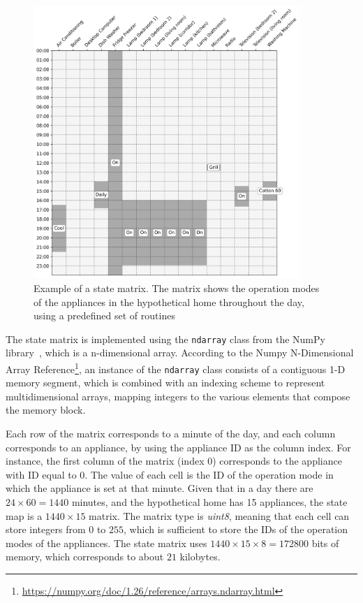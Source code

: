 \begin{figure}
    \centering
    \includegraphics[width=0.9\textwidth]{images/real_matrix.png}
    \caption[Example of a state matrix]{Example of a state matrix. The matrix shows the operation modes of the appliances in the hypothetical home throughout the day, using a predefined set of routines}
    \label{fig:state_matrix}
\end{figure}

The state matrix is implemented using the \texttt{ndarray} class from the NumPy library~\parencite{harrisArrayProgrammingNumPy2020}, which is a n-dimensional array. According to the Numpy N-Dimensional Array Reference\footnote{\url{https://numpy.org/doc/1.26/reference/arrays.ndarray.html}}, an instance of the \texttt{ndarray} class consists of a contiguous 1-D memory segment, which is combined with an indexing scheme to represent multidimensional arrays, mapping integers to the various elements that compose the memory block.

Each row of the matrix corresponds to a minute of the day, and each column corresponds to an appliance, by using the appliance ID as the column index. For instance, the first column of the matrix (index $0$) corresponds to the appliance with ID equal to $0$. The value of each cell is the ID of the operation mode in which the appliance is set at that minute. Given that in a day there are $24 \times 60 = 1440$ minutes, and the hypothetical home has 15 appliances, the state map is a $1440 \times 15$ matrix. The matrix type is \textit{uint8}, meaning that each cell can store integers from $0$ to $255$, which is sufficient to store the IDs of the operation modes of the appliances. The state matrix uses $1440 \times 15 \times 8 = 172800$ bits of memory, which corresponds to about $21$ kilobytes.

